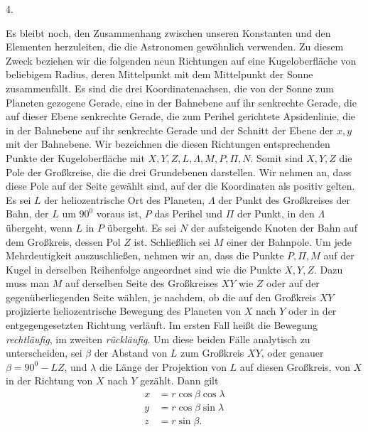 \par{}\bigskip
{}
\begin{center}4.\end{center}
\noindent\hspace*{\parindent}Es bleibt noch, den Zusammenhang zwischen unseren Konstanten und den Elementen herzuleiten, die die Astronomen gewöhnlich verwenden. Zu diesem Zweck beziehen wir die folgenden neun Richtungen auf eine Kugeloberfläche von beliebigem Radius, deren Mittelpunkt mit dem Mittelpunkt der Sonne zusammenfällt. Es sind die drei Koordinatenachsen, die von der Sonne zum Planeten gezogene Gerade, eine in der Bahnebene auf ihr senkrechte Gerade, die auf dieser Ebene senkrechte Gerade, die zum Perihel gerichtete Apsidenlinie, die in der Bahnebene auf ihr senkrechte Gerade und der Schnitt der Ebene der \(x,y\) mit der Bahnebene. Wir bezeichnen die diesen Richtungen entsprechenden Punkte der Kugeloberfläche mit \(X,Y,Z,L,\Lambda,M,P,\Pi,N\). Somit sind \(X,Y,Z\) die Pole der Großkreise, die die drei Grundebenen darstellen. Wir nehmen an, dass diese Pole auf der Seite gewählt sind, auf der die Koordinaten als positiv gelten. Es sei \(L\) der heliozentrische Ort des Planeten, \(\Lambda\) der Punkt des Großkreises der Bahn, der \(L\) um \(90^{0}\) voraus ist, \(P\) das Perihel und \(\Pi\) der Punkt, in den \(\Lambda\) übergeht, wenn \(L\) in \(P\) übergeht. Es sei \(N\) der aufsteigende Knoten der Bahn auf dem Großkreis, dessen Pol \(Z\) ist. Schließlich sei \(M\) einer der Bahnpole. Um jede Mehrdeutigkeit auszuschließen, nehmen wir an, dass die Punkte \(P,\Pi,M\) auf der Kugel in derselben Reihenfolge angeordnet sind wie die Punkte \(X,Y,Z\). Dazu muss man \(M\) auf derselben Seite des Großkreises \(XY\) wie \(Z\) oder auf der gegenüberliegenden Seite wählen, je nachdem, ob die auf den Großkreis \(XY\) projizierte heliozentrische Bewegung des Planeten von \(X\) nach \(Y\) oder in der entgegengesetzten Richtung verläuft. Im ersten Fall heißt die Bewegung \textit{rechtläufig}, im zweiten \textit{rückläufig}. Um diese beiden Fälle analytisch zu unterscheiden, sei \(\beta\) der Abstand von \(L\) zum Großkreis \(XY\), oder genauer \(\beta=90^{0}-LZ\), und \(\lambda\) die Länge der Projektion von \(L\) auf diesen Großkreis, von \(X\) in der Richtung von \(X\) nach \(Y\) gezählt. Dann gilt
\[
\begin{aligned}
x&=r\cos\beta\cos\lambda\\
y&=r\cos\beta\sin\lambda\\
z&=r\sin\beta.
\end{aligned}
\]

